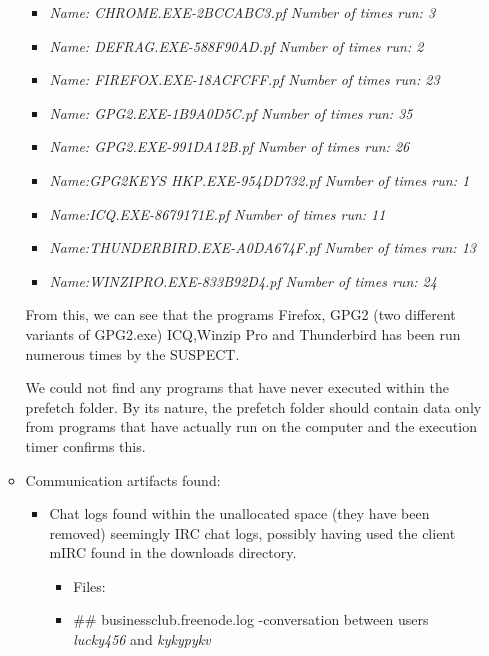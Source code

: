 \begin{enumerate}
\begin{itemize}
		\begin{itemize}
			\item \textit{Name: CHROME.EXE-2BCCABC3.pf}   \textit{Number of times run: 3}		
			\item \textit{Name: DEFRAG.EXE-588F90AD.pf}   \textit{Number of times run: 2}
			\item \textit{Name: FIREFOX.EXE-18ACFCFF.pf}   \textit{Number of times run: 23}
			\item \textit{Name: GPG2.EXE-1B9A0D5C.pf}   \textit{Number of times run: 35}
			\item \textit{Name: GPG2.EXE-991DA12B.pf}  	\textit{Number of times run: 26}
			\item \textit{Name:GPG2KEYS \textunderscore HKP.EXE-954DD732.pf}   \textit{Number of times run: 1}
			\item \textit{Name:ICQ.EXE-8679171E.pf}   	\textit{Number of times run: 11}
			\item \textit{Name:THUNDERBIRD.EXE-A0DA674F.pf}   \textit{Number of times run: 13}
			\item \textit{Name:WINZIPRO.EXE-833B92D4.pf}  	\textit{Number of times run: 24}
			
		\end{itemize}
	
	From this, we can see that the programs Firefox, GPG2 (two different variants of GPG2.exe) ICQ,Winzip Pro and Thunderbird has been run numerous times by the SUSPECT.
	
	We could not find any programs that have never executed within the prefetch folder. By its nature, the prefetch folder should contain data only from programs that have actually run on the computer and the execution timer confirms this.
	
	\item Communication artifacts found:
	
	\begin{itemize}
		
		\item Chat logs found within the unallocated space (they have been removed) seemingly IRC chat logs, possibly having used the client mIRC found in the downloads directory.
		
		 \begin{itemize}
		 	\item Files: 
		 	\item \#\# businessclub.freenode.log -conversation between users \textit{lucky456} and  \textit{kykypykv}
		 	

\end{itemize}
\end{itemize}
\end{itemize}
\end{enumerate}
